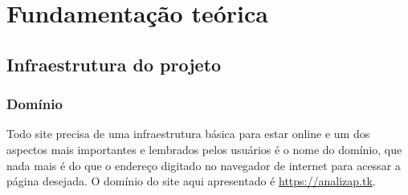 \chapter{Fundamentação teórica}


\section{Infraestrutura do projeto}

\subsection{Domínio}

Todo site precisa de uma infraestrutura básica para estar online e um dos aspectos mais importantes e lembrados pelos usuários é o nome do domínio, que nada mais é do que o endereço digitado no navegador de internet para acessar a página desejada. O domínio do site aqui apresentado é \url{https://analizap.tk}.